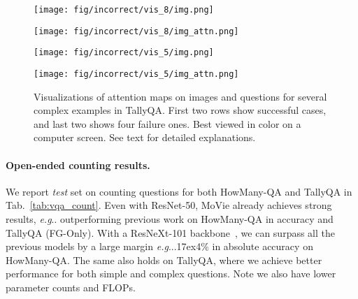 \documentclass{article} \usepackage[dvipsnames,table]{xcolor}
\makeatletter
\newcommand{\ours}[0]{MoVie\xspace}
\newcommand{\app}{\raise.17ex\hbox{}}
\DeclareRobustCommand\onedot{\futurelet\@let@token\@onedot}
\def\@onedot{\ifx\@let@token.\else.\null\fi\xspace}
\def\eg{\emph{e.g}\onedot} \def\Eg{\emph{E.g}\onedot}
\makeatother
\begin{document}
\begin{figure}[t]
\centering
    \begin{minipage}[t]{0.47\linewidth}
        \begin{minipage}{0.47\linewidth}
            \centering
            \texttt{[image: fig/incorrect/vis\_8/img.png]}
        \end{minipage}
        \begin{minipage}{0.47\linewidth}
            \centering
            \texttt{[image: fig/incorrect/vis\_8/img\_attn.png]}
        \end{minipage}
    \end{minipage}
    \begin{minipage}[t]{0.47\linewidth}
        \begin{minipage}{0.47\linewidth}
            \centering
            \texttt{[image: fig/incorrect/vis\_5/img.png]}
        \end{minipage}
        \begin{minipage}{0.47\linewidth}
            \centering
            \texttt{[image: fig/incorrect/vis\_5/img\_attn.png]}
        \end{minipage}
    \end{minipage}
    
    \centering
    \begin{minipage}[t]{0.47\linewidth}
        \centering
        
    \end{minipage}
    \begin{minipage}[t]{0.47\linewidth}
        \centering
        
    \end{minipage}
\caption{Visualizations of attention maps on images and questions for several complex examples in TallyQA. First two rows show successful cases, and last two shows four failure ones. Best viewed in color on a computer screen. See text for detailed explanations. \label{fig:visualization}}
\end{figure}


\paragraph{Open-ended counting results.} We report {\em test} set on counting questions for both HowMany-QA and TallyQA in Tab.~\ref{tab:vqa_count}. Even with ResNet-50, \ours already achieves strong results, \eg outperforming previous work on HowMany-QA in accuracy and TallyQA (FG-Only). With a ResNeXt-101 backbone~\cite{xie2017aggregated}, we can surpass all the previous models by a large margin \eg \app4\% in absolute accuracy on HowMany-QA. The same also holds on TallyQA, where we achieve better performance for both simple and complex questions. Note we also have lower parameter counts and FLOPs.
\end{document}

